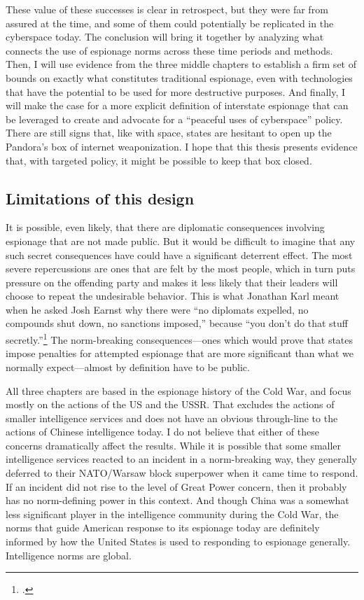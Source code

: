 \documentclass[11pt]{memoir}
\begin{document}
\begin{refsegment}
These value of these successes is clear in retrospect, but they were far from assured at the time, and some of them could potentially be replicated in the cyberspace today. The conclusion will bring it together by analyzing what connects the use of espionage norms across these time periods and methods. Then, I will use evidence from the three middle chapters to establish a firm set of bounds on exactly what constitutes traditional espionage, even with technologies that have the potential to be used for more destructive purposes. And finally, I will make the case for a more explicit definition of interstate espionage that can be leveraged to create and advocate for a ``peaceful uses of cyberspace'' policy. There are still signs that, like with space, states are hesitant to open up the Pandora's box of internet weaponization. I hope that this thesis presents evidence that, with targeted policy, it might be possible to keep that box closed.

\subsection{Limitations of this design}
It is possible, even likely, that there are diplomatic consequences involving espionage that are not made public. But it would be difficult to imagine that any such secret consequences have could have a significant deterrent effect.  The most severe repercussions are ones that are felt by the most people, which in turn puts pressure on the offending party and makes it less likely that their leaders will choose to repeat the undesirable behavior. This is what Jonathan Karl meant when he asked Josh Earnst why there were ``no diplomats expelled, no compounds shut down, no sanctions imposed,'' because ``you don't do that stuff secretly.''\footcite{earnest_press_2017} The norm-breaking consequences---ones which would prove that states impose penalties for attempted espionage that are more significant than what we normally expect---almost by definition have to be public.

All three chapters are based in the espionage history of the Cold War, and focus mostly on the actions of the US and the USSR. That excludes the actions of smaller intelligence services and does not have an obvious through-line to the actions of Chinese intelligence today. I do not believe that either of these concerns dramatically affect the results. While it is possible that some smaller intelligence services reacted to an incident in a norm-breaking way, they generally deferred to their NATO/Warsaw block superpower when it came time to respond. If an incident did not rise to the level of Great Power concern, then it probably has no norm-defining power in this context. And though China was a somewhat less significant player in the intelligence community during the Cold War, the norms that guide American response to its espionage today are definitely informed by how the United States is used to responding to espionage generally. Intelligence norms are global.


\end{refsegment}
\end{document}
